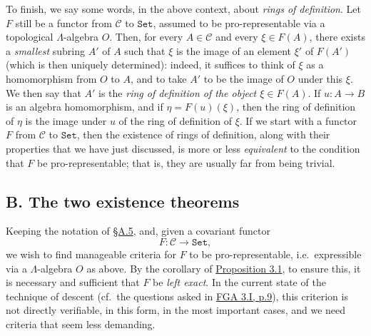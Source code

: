 \documentclass{article}
\newcommand{\oldpage}[1]{\marginpar{\footnotesize$\Big\vert$ \textit{p.~#1}}}
\theoremstyle{definition}
\theoremstyle{definition}
\theoremstyle{definition}
\theoremstyle{definition}
\theoremstyle{remark}
\begin{document}
\oldpage{195-09}To finish, we say some words, in the above context, about \emph{rings of definition}.
Let \(F\) still be a functor from \({\mathcal{C}}\) to \(\mathtt{Set}\), assumed to be pro-representable via a topological \(\Lambda\)-algebra \(O\).
Then, for every \(A\in{\mathcal{C}}\) and every \(\xi\in F(A)\), there exists a \emph{smallest} subring \(A'\) of \(A\) such that \(\xi\) is the image of an element \(\xi'\) of \(F(A')\) (which is then uniquely determined):
indeed, it suffices to think of \(\xi\) as a homomorphism from \(O\) to \(A\), and to take \(A'\) to be the image of \(O\) under this \(\xi\).
We then say that \(A'\) is the \emph{ring of definition of the object \(\xi\in F(A)\)}.
If \(u\colon A\to B\) is an algebra homomorphism, and if \(\eta=F(u)(\xi)\), then the ring of definition of \(\eta\) is the image under \(u\) of the ring of definition of \(\xi\).
If we start with a functor \(F\) from \({\mathcal{C}}\) to \(\mathtt{Set}\), then the existence of rings of definition, along with their properties that we have just discussed, is more or less \emph{equivalent} to the condition that \(F\) be pro-representable;
that is, they are usually far from being trivial.

\hypertarget{fga-3-ii-section-B}{%
\subsection*{\texorpdfstring{\textbf{B.} The two existence theorems}{B. The two existence theorems}}\label{fga-3-ii-section-B}}

Keeping the notation of \protect\hyperlink{fga-3-ii-section-A.5}{§A.5}, and, given a covariant functor
\[
  F\colon {\mathcal{C}} \to \mathtt{Set},
\]
we wish to find manageable criteria for \(F\) to be pro-representable, i.e.~expressible via a \(\Lambda\)-algebra \(O\) as above.
By the corollary of \protect\hyperlink{fga-3-ii-section-A.3-proposition-3.1}{Proposition 3.1}, to ensure this, it is necessary and sufficient that \(F\) be \emph{left exact}.
In the current state of the technique of descent (cf.~the questions asked in \protect\hyperlink{fga-3-i-section-A.2.c}{FGA 3.I, p.9}), this criterion is not directly verifiable, in this form, in the most important cases, and we need criteria that seem less demanding.
\end{document}

